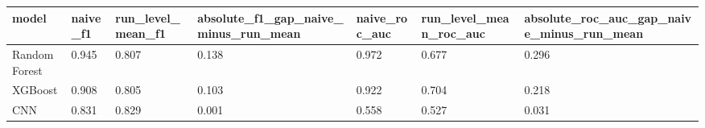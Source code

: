 \begin{tabular}{lllllll}
\toprule
model & naive_f1 & run_level_mean_f1 & absolute_f1_gap_naive_minus_run_mean & naive_roc_auc & run_level_mean_roc_auc & absolute_roc_auc_gap_naive_minus_run_mean \\
\midrule
Random Forest & 0.945 & 0.807 & 0.138 & 0.972 & 0.677 & 0.296 \\
XGBoost & 0.908 & 0.805 & 0.103 & 0.922 & 0.704 & 0.218 \\
CNN & 0.831 & 0.829 & 0.001 & 0.558 & 0.527 & 0.031 \\
\bottomrule
\end{tabular}
